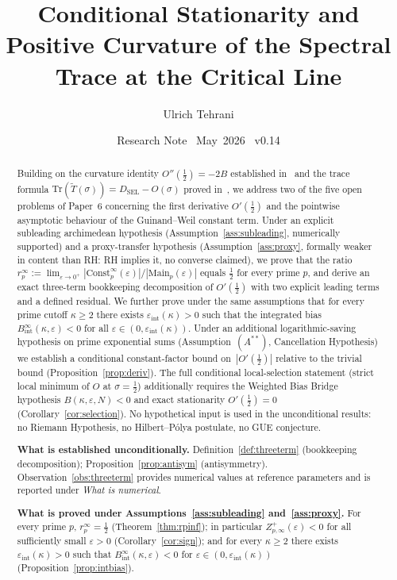 \documentclass[11pt]{article}
\title{\vspace{-1.5em}\bfseries Conditional Stationarity and Positive
Curvature of the Spectral Trace at the Critical Line}
\author{Ulrich Tehrani}
\date{Research Note \textperiodcentered\ May~2026
      \textperiodcentered\ v0.14}
\newcommand{\Tt}{\widetilde{T}}
\newcommand{\DSEL}{D_{\mathrm{SEL}}}
\newcommand{\Astar}{\ensuremath{(A^{**})}}  %
\begin{document}
\maketitle

\begin{abstract}
Building on the curvature identity $O''(\tfrac12)=-2B$ established
in~\cite{Paper6} and the trace formula $\mathrm{Tr}(\Tt(\sigma))=\DSEL-O(\sigma)$
proved in~\cite{Paper5}, we address two of the five open problems
of Paper~6 concerning the first derivative $O'(\tfrac12)$ and the
pointwise asymptotic behaviour of the Guinand--Weil constant term.
Under an explicit subleading archimedean hypothesis
(Assumption~\ref{ass:subleading}, numerically supported) and a
proxy-transfer hypothesis (Assumption~\ref{ass:proxy},
formally weaker in content than RH: RH implies it, no converse claimed),
we prove that the ratio $r_p^\infty := \lim_{\varepsilon\to 0^+}
|\mathrm{Const}_p^\infty(\varepsilon)|/|\mathrm{Main}_p(\varepsilon)|$ equals
$\tfrac12$ for every prime $p$, and derive an exact
three-term bookkeeping decomposition of $O'(\tfrac12)$
with two explicit leading terms and a defined residual.
We further prove under the same assumptions that for every prime cutoff
$\kappa\ge 2$ there exists $\varepsilon_{\mathrm{int}}(\kappa)>0$ such that the
integrated bias $B_{\mathrm{int}}^\infty(\kappa,\varepsilon)<0$ for all
$\varepsilon\in(0,\varepsilon_{\mathrm{int}}(\kappa))$.
Under an additional logarithmic-saving hypothesis on prime exponential sums
(Assumption~\Astar, Cancellation Hypothesis) we establish a conditional
constant-factor bound on~$|O'(\tfrac12)|$ relative to the trivial bound
(Proposition~\ref{prop:deriv}).
The full conditional local-selection statement (strict local minimum of
$O$ at $\sigma=\tfrac12$) additionally requires the Weighted Bias Bridge
hypothesis $B(\kappa,\varepsilon,N)<0$ and exact stationarity
$O'(\tfrac12)=0$ (Corollary~\ref{cor:selection}).
No hypothetical input is used in the unconditional results: no Riemann
Hypothesis, no Hilbert--P\'olya postulate, no GUE conjecture.

\textbf{What is established unconditionally.}
Definition~\ref{def:threeterm} (bookkeeping decomposition);
Proposition~\ref{prop:antisym} (antisymmetry).
Observation~\ref{obs:threeterm} provides numerical values at
reference parameters and is reported under \emph{What is numerical}.

\textbf{What is proved under Assumptions~\ref{ass:subleading} and~\ref{ass:proxy}.}
For every prime $p$, $r_p^\infty = \tfrac12$ (Theorem~\ref{thm:rpinf});
in particular $Z_{p,\infty}^+(\varepsilon)<0$ for all sufficiently small
$\varepsilon>0$ (Corollary~\ref{cor:sign});
and for every $\kappa\ge 2$ there exists $\varepsilon_{\mathrm{int}}(\kappa)>0$
such that $B_{\mathrm{int}}^\infty(\kappa,\varepsilon)<0$ for
$\varepsilon\in(0,\varepsilon_{\mathrm{int}}(\kappa))$
(Proposition~\ref{prop:intbias}).


\end{abstract}
\end{document}
